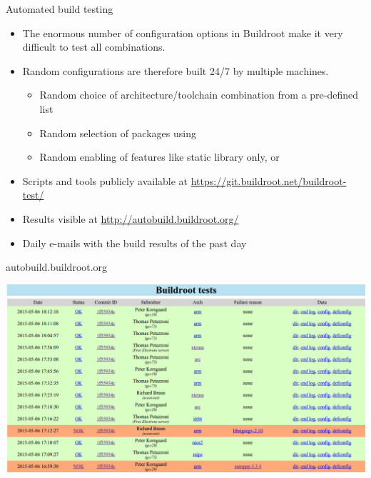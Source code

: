 \begin{frame}{Automated build testing}
  \begin{itemize}
  \item The enormous number of configuration options in Buildroot make
    it very difficult to test all combinations.
  \item Random configurations are therefore built 24/7 by multiple
    machines.
    \begin{itemize}
    \item Random choice of architecture/toolchain combination from a
      pre-defined list
    \item Random selection of packages using 
    \item Random enabling of features like static library only, or
    \end{itemize}
  \item Scripts and tools publicly available at
    \url{https://git.buildroot.net/buildroot-test/}
  \item Results visible at \url{http://autobuild.buildroot.org/}
  \item Daily e-mails with the build results of the past day
  \end{itemize}
\end{frame}

\begin{frame}{autobuild.buildroot.org}
  \begin{center}
    \includegraphics[width=\textwidth]{slides/buildroot-support-contribution/autobuild.png}
  \end{center}
\end{frame}

